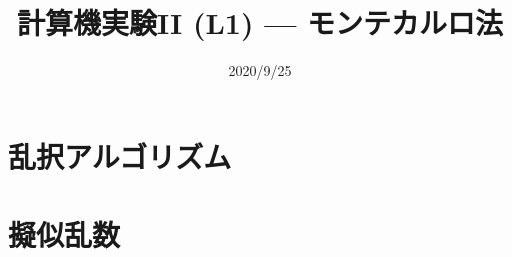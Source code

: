 \documentclass[10pt,dvipdfmx]{beamer}
\title{計算機実験II (L1) --- モンテカルロ法}
\date{2020/9/25}
\begin{document}
\begin{frame}
  \titlepage
  \tableofcontents
\end{frame}






\section{乱択アルゴリズム}






%
\section{擬似乱数}













\end{document}
